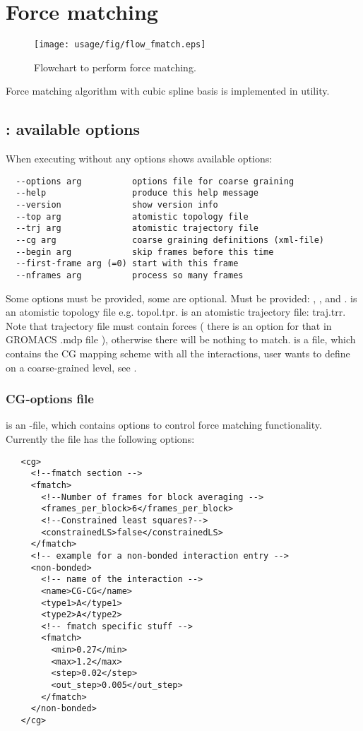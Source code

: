 \section{Force matching}
\sasha
\begin{figure}
   \centering
   \texttt{[image: usage/fig/flow\_fmatch.eps]}
   \caption{Flowchart to perform force matching.}
\end{figure}
Force matching algorithm with cubic spline basis is implemented in \csgfmatch utility.

\subsection{\csgfmatch: available options}
When executing without any options \csgfmatch shows available options:
\begin{verbatim}
  --options arg          options file for coarse graining
  --help                 produce this help message
  --version              show version info
  --top arg              atomistic topology file
  --trj arg              atomistic trajectory file
  --cg arg               coarse graining definitions (xml-file)
  --begin arg            skip frames before this time
  --first-frame arg (=0) start with this frame
  --nframes arg          process so many frames
\end{verbatim}
Some options must be provided, some are optional. Must be provided: , ,  and .  is an atomistic topology file e.g. topol.tpr.  is an atomistic trajectory file: traj.trr. Note that trajectory file must contain forces ( there is an option for that in GROMACS .mdp file ), otherwise there will be nothing to match.  is a file, which contains the CG mapping scheme with all the interactions, user wants to define on a coarse-grained level, see .

\subsubsection{CG-options file}
 is an \xml-file, which contains options to control force matching functionality. 
Currently the file has the following options:

\begin{lstlisting}
   <cg>
     <!--fmatch section -->
     <fmatch>
       <!--Number of frames for block averaging -->
       <frames_per_block>6</frames_per_block>
       <!--Constrained least squares?-->
       <constrainedLS>false</constrainedLS>
     </fmatch>
     <!-- example for a non-bonded interaction entry -->
     <non-bonded>
       <!-- name of the interaction -->
       <name>CG-CG</name>
       <type1>A</type1>
       <type2>A</type2>
       <!-- fmatch specific stuff -->
       <fmatch>
         <min>0.27</min>
         <max>1.2</max>
         <step>0.02</step>
         <out_step>0.005</out_step>
       </fmatch>
     </non-bonded>
   </cg>
\end{lstlisting}

